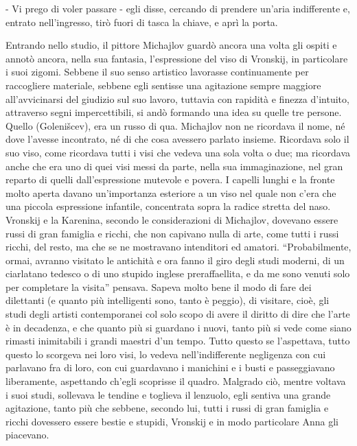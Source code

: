 - Vi prego di voler passare - egli disse, cercando di prendere un'aria indifferente e, entrato nell'ingresso, tirò fuori di tasca la chiave, e aprì la porta. 

\label{xi-4} 

Entrando nello studio, il pittore Michajlov guardò ancora una volta gli ospiti e annotò ancora, nella sua fantasia, l'espressione del viso di Vronskij, in particolare i suoi zigomi. Sebbene il suo senso artistico lavorasse continuamente per raccogliere materiale, sebbene egli sentisse una agitazione sempre maggiore all'avvicinarsi del giudizio sul suo lavoro, tuttavia con rapidità e finezza d'intuito, attraverso segni impercettibili, si andò formando una idea su quelle tre persone. Quello (Golenišcev), era un russo di qua. Michajlov non ne ricordava il nome, né dove l'avesse incontrato, né di che cosa avessero parlato insieme. Ricordava solo il suo viso, come ricordava tutti i visi che vedeva una sola volta o due; ma ricordava anche che era uno di quei visi messi da parte, nella sua immaginazione, nel gran reparto di quelli dall'espressione mutevole e povera. I capelli lunghi e la fronte molto aperta davano un'importanza esteriore a un viso nel quale non c'era che una piccola espressione infantile, concentrata sopra la radice stretta del naso. Vronskij e la Karenina, secondo le considerazioni di Michajlov, dovevano essere russi di gran famiglia e ricchi, che non capivano nulla di arte, come tutti i russi ricchi, del resto, ma che se ne mostravano intenditori ed amatori. ``Probabilmente, ormai, avranno visitato le antichità e ora fanno il giro degli studi moderni, di un ciarlatano tedesco o di uno stupido inglese preraffaellita, e da me sono venuti solo per completare la visita'' pensava. Sapeva molto bene il modo di fare dei dilettanti (e quanto più intelligenti sono, tanto è peggio), di visitare, cioè, gli studi degli artisti contemporanei col solo scopo di avere il diritto di dire che l'arte è in decadenza, e che quanto più si guardano i nuovi, tanto più si vede come siano rimasti inimitabili i grandi maestri d'un tempo. Tutto questo se l'aspettava, tutto questo lo scorgeva nei loro visi, lo vedeva nell'indifferente negligenza con cui parlavano fra di loro, con cui guardavano i manichini e i busti e passeggiavano liberamente, aspettando ch'egli scoprisse il quadro. Malgrado ciò, mentre voltava i suoi studi, sollevava le tendine e toglieva il lenzuolo, egli sentiva una grande agitazione, tanto più che sebbene, secondo lui, tutti i russi di gran famiglia e ricchi dovessero essere bestie e stupidi, Vronskij e in modo particolare Anna gli piacevano. 


